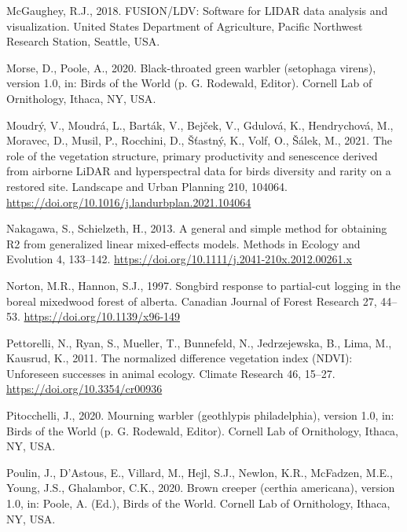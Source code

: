 \documentclass[
  12pt,
]{article}
\newlength{\cslhangindent}
\newlength{\cslentryspacingunit} %
\newenvironment{CSLReferences}[2] %
 {%
  \setlength{\parindent}{0pt}
  \ifodd #1
  \let\oldpar\par
  \def\par{\hangindent=\cslhangindent\oldpar}
  \fi
  \setlength{\parskip}{#2\cslentryspacingunit}
 }%
 {}
\begin{document}
\begin{CSLReferences}{1}{0}
\leavevmode{}%
McGaughey, R.J., 2018. {FUSION}/{LDV}: Software for {LIDAR} data analysis and visualization. United States Department of Agriculture, Pacific Northwest Research Station, Seattle, {USA}.

\leavevmode{}%
Morse, D., Poole, A., 2020. Black-throated green warbler (setophaga virens), version 1.0, in: Birds of the World (p. G. Rodewald, Editor). Cornell Lab of Ornithology, Ithaca, {NY}, {USA}.

\leavevmode{}%
Moudrý, V., Moudrá, L., Barták, V., Bejček, V., Gdulová, K., Hendrychová, M., Moravec, D., Musil, P., Rocchini, D., Šťastný, K., Volf, O., Šálek, M., 2021. The role of the vegetation structure, primary productivity and senescence derived from airborne {LiDAR} and hyperspectral data for birds diversity and rarity on a restored site. Landscape and Urban Planning 210, 104064. \url{https://doi.org/10.1016/j.landurbplan.2021.104064}

\leavevmode{}%
Nakagawa, S., Schielzeth, H., 2013. A general and simple method for obtaining R2 from generalized linear mixed-effects models. Methods in Ecology and Evolution 4, 133--142. \url{https://doi.org/10.1111/j.2041-210x.2012.00261.x}

\leavevmode{}%
Norton, M.R., Hannon, S.J., 1997. Songbird response to partial-cut logging in the boreal mixedwood forest of alberta. Canadian Journal of Forest Research 27, 44--53. \url{https://doi.org/10.1139/x96-149}

\leavevmode{}%
Pettorelli, N., Ryan, S., Mueller, T., Bunnefeld, N., Jedrzejewska, B., Lima, M., Kausrud, K., 2011. The normalized difference vegetation index ({NDVI}): Unforeseen successes in animal ecology. Climate Research 46, 15--27. \url{https://doi.org/10.3354/cr00936}

\leavevmode{}%
Pitocchelli, J., 2020. Mourning warbler (geothlypis philadelphia), version 1.0, in: Birds of the World (p. G. Rodewald, Editor). Cornell Lab of Ornithology, Ithaca, {NY}, {USA}.

\leavevmode{}%
Poulin, J., D'Astous, E., Villard, M., Hejl, S.J., Newlon, K.R., McFadzen, M.E., Young, J.S., Ghalambor, C.K., 2020. Brown creeper (certhia americana), version 1.0, in: Poole, A. (Ed.), Birds of the World. Cornell Lab of Ornithology, Ithaca, {NY}, {USA}.


\end{CSLReferences}
\end{document}
